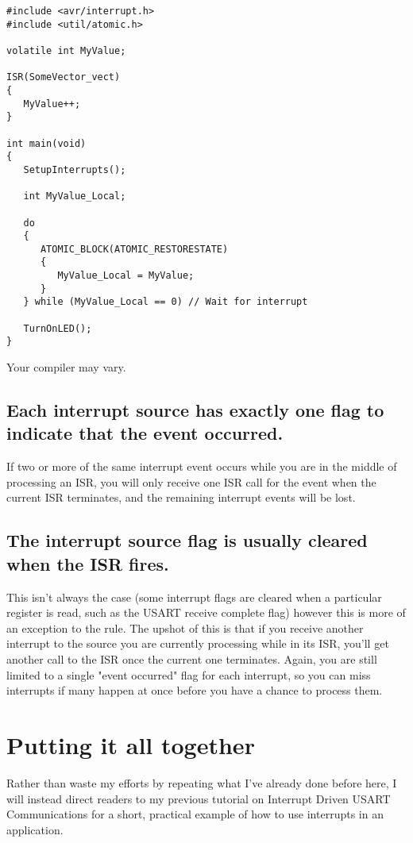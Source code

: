 \documentclass[a4paper,oneside]{book}
\begin{document}
\begin{center}
\begin{lstlisting}
#include <avr/interrupt.h>
#include <util/atomic.h>

volatile int MyValue;

ISR(SomeVector_vect)
{
   MyValue++;
}

int main(void)
{
   SetupInterrupts();

   int MyValue_Local;

   do
   {
      ATOMIC_BLOCK(ATOMIC_RESTORESTATE)
      {
         MyValue_Local = MyValue;
      }
   } while (MyValue_Local == 0) // Wait for interrupt

   TurnOnLED();
}
\end{lstlisting}
\end{center}

Your compiler may vary.

\section{Each interrupt source has exactly one flag to indicate that the event occurred.}
If two or more of the same interrupt event occurs while you are in the middle of processing an ISR, you will only receive one ISR call for the event when the current ISR terminates, and the remaining interrupt events will be lost.

\section{The interrupt source flag is usually cleared when the ISR fires.}
This isn't always the case (some interrupt flags are cleared when a particular register is read, such as the USART receive complete flag) however this is more of an exception to the rule. The upshot of this is that if you receive another interrupt to the source you are currently processing while in its ISR, you'll get another call to the ISR once the current one terminates. Again, you are still limited to a single "event occurred" flag for each interrupt, so you can miss interrupts if many happen at once before you have a chance to process them.


\label{chp:FinalWords}
\chapter{Putting it all together}

Rather than waste my efforts by repeating what I've already done before here, I will instead direct readers to my previous tutorial on Interrupt Driven USART Communications for a short, practical example of how to use interrupts in an application. 
\end{document}
